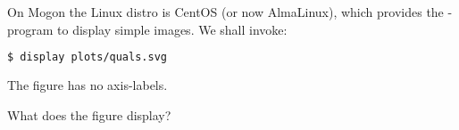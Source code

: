 \begin{frame}[fragile]
  \frametitle{}
  On Mogon the Linux distro is CentOS (or now AlmaLinux), which provides the -program to display simple images. We shall invoke:
  \begin{lstlisting}[language=Bash, style=Shell]
$ display plots/quals.svg
  \end{lstlisting}
  The figure has no axis-labels.
  \begin{question}
  	What does the figure display?
  \end{question}
\end{frame}
